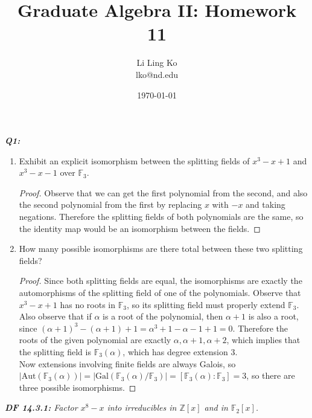 \documentclass{article}
\begin{document}
\title{Graduate Algebra II: Homework 11}
\author{Li Ling Ko\\ lko@nd.edu}
\date{\today}
\maketitle

\it \textbf{Q1:}
  \begin{enumerate}[label={(\alph*)}]
    \item Exhibit an explicit isomorphism between the splitting fields of
      $x^3-x+1$ and $x^3-x-1$ over $\mathbb{F}_3$.

      \begin{proof}
        Observe that we can get the first polynomial from the second, and
        also the second polynomial from the first by replacing $x$ with
        $-x$ and taking negations. Therefore the splitting fields of both
        polynomials are the same, so the identity map would be an
        isomorphism between the fields.
      \end{proof}

    \item How many possible isomorphisms are there total between these two
      splitting fields?

      \begin{proof}
        Since both splitting fields are equal, the isomorphisms are exactly
        the automorphisms of the splitting field of one of the polynomials.
        Observe that $x^3-x+1$ has no roots in $\mathbb{F}_3$, so its
        splitting field must properly extend $\mathbb{F}_3$. Also observe
        that if $\alpha$ is a root of the polynomial, then $\alpha+1$ is
        also a root, since $(\alpha+1)^3-(\alpha+1)+1
        =\alpha^3+1-\alpha-1+1=0$. Therefore the roots of the given
        polynomial are exactly $\alpha,\alpha+1,\alpha+2$, which implies
        that the splitting field is $\mathbb{F}_3(\alpha)$, which has degree
        extension 3. \\

        Now extensions involving finite fields are always Galois,
        so $|\text{Aut}(\mathbb{F}_3(\alpha))|
        =|\text{Gal}(\mathbb{F}_3(\alpha)/\mathbb{F}_3)|
        =[\mathbb{F}_3(\alpha):\mathbb{F}_3] =3$, so there are three
        possible isomorphisms.
      \end{proof}
  \end{enumerate}

\it \textbf{DF 14.3.1:} Factor $x^8-x$ into irreducibles in $\mathbb{Z}[x]$
  and in $\mathbb{F}_2[x]$.
\end{document}
